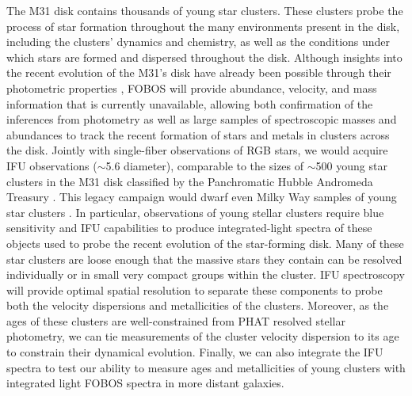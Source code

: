 \documentclass[11pt,a4paper,twoside,onecolumn,openany,final,oldfontcommands]{memoir}
\begin{document}
The M31 disk contains thousands of young star clusters.  These clusters probe the process of star formation throughout the many environments present in the disk, including the clusters' dynamics and chemistry, as well as the conditions under which stars are formed and dispersed throughout the disk.  Although insights into the recent evolution of the M31's disk have already been possible through their photometric properties \citep[e.g.,][]{johnson16}, FOBOS will provide abundance, velocity, and mass information that is currently unavailable, allowing both confirmation of the inferences from photometry as well as large samples of spectroscopic masses and abundances to track the recent formation of stars and metals in clusters across the disk. Jointly with single-fiber observations of RGB stars, we would acquire IFU observations ($\sim$5.6\arcsec{} diameter), comparable to the sizes of $\sim$500  young star clusters in the M31 disk classified by the Panchromatic Hubble Andromeda Treasury \citep[PHAT;][]{johnson15}.  This legacy campaign would dwarf even Milky Way samples of young star clusters \citep{johnson15}.  In particular, observations of young stellar clusters require blue sensitivity and IFU capabilities to produce integrated-light spectra of these objects used to probe the recent evolution of the star-forming disk. Many of these star clusters are loose enough that the massive stars they contain can be resolved individually or in small very compact groups within the cluster.  IFU spectroscopy will provide optimal spatial resolution to separate these components to probe both the velocity dispersions and metallicities of the clusters.  Moreover, as the ages of these clusters are well-constrained from PHAT resolved stellar photometry, we can tie measurements of the cluster velocity dispersion to its age to constrain their dynamical evolution.  Finally, we can also integrate the IFU spectra to test our ability to measure ages and metallicities of young clusters with integrated light FOBOS spectra in more distant galaxies.

\end{document}

